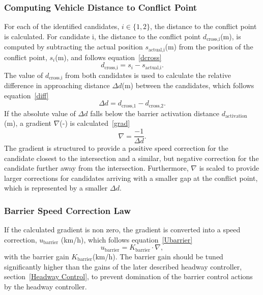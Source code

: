 \subsubsection{Computing Vehicle Distance to Conflict Point}
For each of the identified candidates, \(i \in\{1,2\}\), the distance to the conflict point is calculated. For candidate i, the distance to the conflict point \(d_\text{cross,i}\)(m), is computed by subtracting the actual position \(s_\text{actual,i}\)(m) from the position of the conflict point, \(s_i\)(m), and follows equation~\ref{dcross}\begin{equation}
\label{dcross}
    d_\text{cross,i}= s_i - s_\text{actual,i}.
\end{equation}
The value of \(d_\text{cross,i}\) from both candidates is used to calculate the relative difference in approaching distance \(\Delta d\)(m) between the candidates, which follows equation~\ref{diff}\begin{equation}
\label{diff}
    \Delta d = d_\text{cross,1} - d_\text{cross,2}.
\end{equation}
If the absolute value of \(\Delta d\) falls below the barrier activation distance \(d_\text{activation}\)(m), a gradient \(\nabla\)(-) is calculated~\ref{grad}
\begin{equation}
\label{grad}
\nabla = \frac{-1}{\Delta d}.
\end{equation}
The gradient is structured to provide a positive speed correction for the candidate closest to the intersection and a similar, but negative correction for the candidate further away from the intersection.  Furthermore, \(\nabla\) is scaled to provide larger corrections for candidates arriving with a smaller gap at the conflict point, which is represented by a smaller \(\Delta d\). 

\subsubsection{Barrier Speed Correction Law}
\label{BArrier law}
If the calculated gradient is non zero, the gradient is converted into a speed correction, \(u_\text{barrier}\) (km/h), which follows equation~\ref{Ubarrier}
\begin{equation}
\label{Ubarrier}
u_\text{barrier} = K_\text{barrier} \cdot \nabla,
\end{equation}
with the barrier gain \(K_\text{barrier}\)(km/h). The barrier gain should be tuned significantly higher than the gains of the later described headway controller, section~\ref{Headway Control}, to prevent domination of the barrier control actions by the headway controller.  




